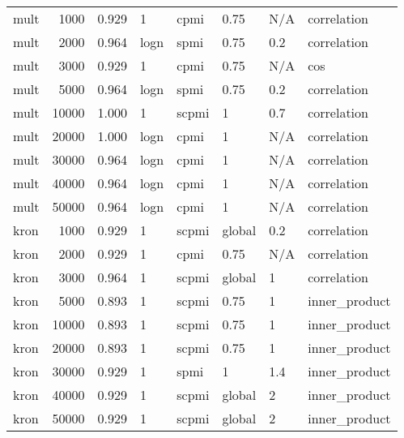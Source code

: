 \begin{tabular}{lrrlllll}
    mult &            1000 &      0.929 &     1 &   cpmi &    0.75 &  N/A &    correlation \\
    mult &            2000 &      0.964 &  logn &   spmi &    0.75 &  0.2 &    correlation \\
    mult &            3000 &      0.929 &     1 &   cpmi &    0.75 &  N/A &            cos \\
    mult &            5000 &      0.964 &  logn &   spmi &    0.75 &  0.2 &    correlation \\
    mult &           10000 &      1.000 &     1 &  scpmi &       1 &  0.7 &    correlation \\
    mult &           20000 &      1.000 &  logn &   cpmi &       1 &  N/A &    correlation \\
    mult &           30000 &      0.964 &  logn &   cpmi &       1 &  N/A &    correlation \\
    mult &           40000 &      0.964 &  logn &   cpmi &       1 &  N/A &    correlation \\
    mult &           50000 &      0.964 &  logn &   cpmi &       1 &  N/A &    correlation \\
    kron &            1000 &      0.929 &     1 &  scpmi &  global &  0.2 &    correlation \\
    kron &            2000 &      0.929 &     1 &   cpmi &    0.75 &  N/A &    correlation \\
    kron &            3000 &      0.964 &     1 &  scpmi &  global &    1 &    correlation \\
    kron &            5000 &      0.893 &     1 &  scpmi &    0.75 &    1 &  inner\_product \\
    kron &           10000 &      0.893 &     1 &  scpmi &    0.75 &    1 &  inner\_product \\
    kron &           20000 &      0.893 &     1 &  scpmi &    0.75 &    1 &  inner\_product \\
    kron &           30000 &      0.929 &     1 &   spmi &       1 &  1.4 &  inner\_product \\
    kron &           40000 &      0.929 &     1 &  scpmi &  global &    2 &  inner\_product \\
    kron &           50000 &      0.929 &     1 &  scpmi &  global &    2 &  inner\_product \\
\bottomrule
\end{tabular}
